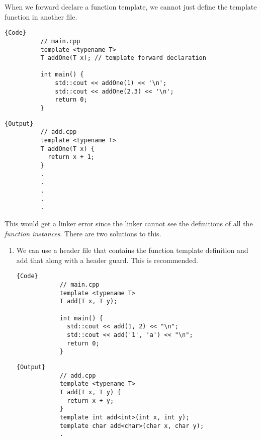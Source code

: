 \documentclass{article}
\begin{document}
    \begin{lemma}
      When we forward declare a function template, we cannot just define the template function in another file. 

      \noindent\begin{minipage}{.5\textwidth}
        \begin{lstlisting}[]{Code} 
          // main.cpp
          template <typename T>
          T addOne(T x); // template forward declaration

          int main() {
              std::cout << addOne(1) << '\n';
              std::cout << addOne(2.3) << '\n';
              return 0;
          }
        \end{lstlisting}
        \end{minipage}
        \hfill
        \begin{minipage}{.49\textwidth}
        \begin{lstlisting}[]{Output}
          // add.cpp
          template <typename T>
          T addOne(T x) {
            return x + 1;
          }
          .
          .
          .
          .
          .
        \end{lstlisting}
      \end{minipage}

      This would get a linker error since the linker cannot see the definitions of all the \textit{function instances}. There are two solutions to this. 
      \begin{enumerate}
        \item We can use a header file that contains the function template definition and add that along with a header guard. This is recommended. 

        \noindent\begin{minipage}{.45\textwidth}
          \begin{lstlisting}[]{Code}
            // main.cpp
            template <typename T> 
            T add(T x, T y); 

            int main() { 
              std::cout << add(1, 2) << "\n";
              std::cout << add('1', 'a') << "\n";
              return 0; 
            }
          \end{lstlisting}
          \end{minipage}
          \hfill
          \begin{minipage}{.44\textwidth}
          \begin{lstlisting}[]{Output}
            // add.cpp
            template <typename T>
            T add(T x, T y) {
              return x + y;
            }
            template int add<int>(int x, int y);
            template char add<char>(char x, char y);
            .
          \end{lstlisting}
        \end{minipage}


\end{enumerate}
\end{lemma}
\end{document}
